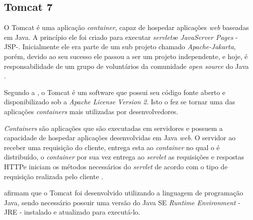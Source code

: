 \subsection{Tomcat 7}

\par O Tomcat é uma aplicação \textit{container}, capaz de hospedar aplicações \textit{web} baseadas em Java. A princípio ele foi criado para executar \textit{servlets}\footnotemark[14] e \textit{JavaServer Pages} - JSP\footnotemark[15] -. Inicialmente ele era parte de um sub projeto chamado \textit{Apache-Jakarta}, porém, devido ao seu sucesso ele passou a ser um projeto independente, e hoje, é responsabilidade de um grupo de voluntários da comunidade \textit{open source} do Java \cite{vukotic_goodwill_apache_tomcat_7}.



\par Segundo a , o Tomcat é um software que possui seu código fonte aberto e disponibilizado sob a \textit{Apache License Version 2}. Isto o fez se tornar uma das aplicações \textit{containers} mais utilizadas por desenvolvedores.

\par \textit{Containers} são aplicações que são executadas em servidores e possuem a capacidade de hospedar aplicações desenvolvidas em Java \textit{web}. O servidor ao receber uma requisição do cliente, entrega esta ao \textit{container} no qual o \textit{} é distribuído, o \textit{container} por sua vez entrega ao \textit{servlet} as requisições e respostas HTTP\footnotemark[16] e iniciam os métodos necessários do \textit{servlet} de acordo com o tipo de requisição realizada pelo cliente \cite{basham_sierra_bates_use_cabeca_servlets_jsp}.


\par {} afirmam que o Tomcat foi desenvolvido utilizando a linguagem de programação Java, sendo necessário possuir uma versão do Java SE \textit{Runtime Environment} - JRE - instalado e atualizado para executá-lo.

